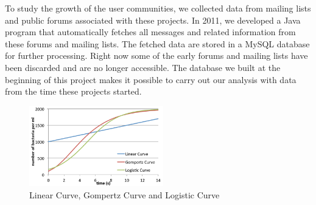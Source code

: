 \documentclass[conference]{IEEEtran}
\begin{document}
To study the growth of the user communities, we collected data from mailing lists and public forums associated with these projects. In 2011, we developed a Java program that automatically fetches all messages and related information from these forums and mailing lists. The fetched data are stored in a MySQL database for further processing. Right now some of the early forums and mailing lists have been discarded and are no longer accessible. The database we built at the beginning of this project makes it possible to carry out our analysis with data from the time these projects started.

\begin{figure}[t!]
\centering
\includegraphics[height=3.5cm]{2_fig02}
\caption{Linear Curve, Gompertz Curve and Logistic Curve}
\vspace{-10pt}
\label{fig:growth_theory}
\end{figure}
\end{document}
